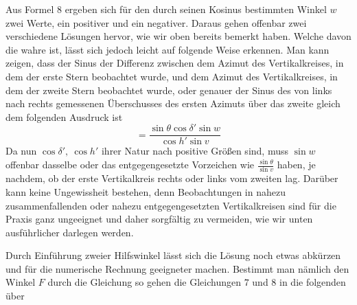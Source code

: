 Aus Formel $8$ ergeben sich für den durch seinen Kosinus bestimmten Winkel $w$ zwei Werte, ein positiver und ein negativer. Daraus gehen offenbar zwei verschiedene Lösungen hervor, wie wir oben bereits bemerkt haben. Welche davon die wahre ist, lässt sich jedoch leicht auf folgende Weise erkennen. Man kann zeigen, dass der Sinus der Differenz zwischen dem Azimut des Vertikalkreises, in dem der erste Stern beobachtet wurde, und dem Azimut des Vertikalkreises, in dem der zweite Stern beobachtet wurde, oder genauer der Sinus des von links nach rechts gemessenen Überschusses des ersten Azimuts über das zweite gleich dem folgenden Ausdruck ist
\[
=\frac{\sin\theta\cos\delta'\sin w}{\cos h'\sin v}
\]
Da nun $\cos\delta',\ \cos h'$ ihrer Natur nach positive Größen sind, muss $\sin w$ offenbar dasselbe oder das entgegengesetzte Vorzeichen wie $\frac{\sin\theta}{\sin v}$ haben, je nachdem, ob der erste Vertikalkreis rechts oder links vom zweiten lag. Darüber kann keine Ungewissheit bestehen, denn Beobachtungen in nahezu zusammenfallenden oder nahezu entgegengesetzten Vertikalkreisen sind für die Praxis ganz ungeeignet und daher sorgfältig zu vermeiden, wie wir unten ausführlicher darlegen werden.

Durch Einführung zweier Hilfswinkel lässt sich die Lösung noch etwas abkürzen und für die numerische Rechnung geeigneter machen. Bestimmt man nämlich den Winkel $F$ durch die Gleichung
so gehen die Gleichungen $7$ und $8$ in die folgenden über

